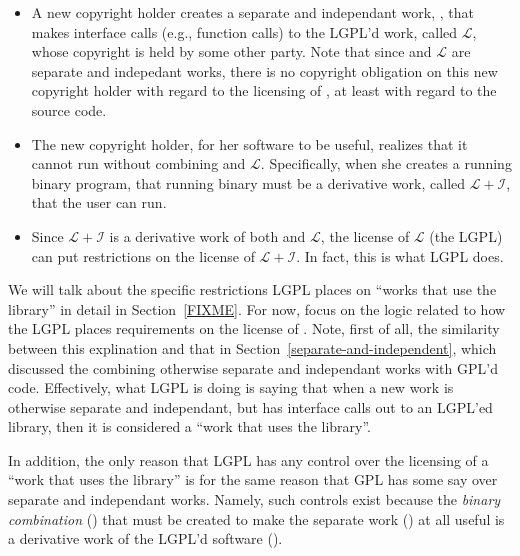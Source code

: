 \documentclass[12pt]{report}
\begin{document}
\begin{itemize}

\newcommand{\workl}{$\mathcal{L}$}
\newcommand{\lplusi}{$\mathcal{L\!\!+\!\!I}$}

\item A new copyright holder creates a separate and independant work,
  \worki{}, that makes interface calls (e.g., function calls) to the
  LGPL'd work, called \workl{}, whose copyright is held by some other
  party.  Note that since \worki{} and \workl{} are separate and
  indepedant works, there is no copyright obligation on this new copyright
  holder with regard to the licensing of \worki{}, at least with regard to
  the source code.

\item The new copyright holder, for her software to be useful, realizes
  that it cannot run without combining \worki{} and \workl{}.
  Specifically, when she creates a running binary program, that running
  binary must be a derivative work, called \lplusi{}, that the user can
  run.

\item Since \lplusi{} is a derivative work of both \worki{} and \workl{},
  the license of \workl{} (the LGPL) can put restrictions on the license
  of \lplusi{}.  In fact, this is what LGPL does.

\end{itemize}

We will talk about the specific restrictions LGPL places on ``works that
use the library'' in detail in Section~\ref{FIXME}.  For now, focus on the
logic related to how the LGPL places requirements on the license of
\lplusi{}.  Note, first of all, the similarity between this explination
and that in Section~\ref{separate-and-independent}, which discussed the
combining otherwise separate and independant works with GPL'd code.
Effectively, what LGPL is doing is saying that when a new work is
otherwise separate and independant, but has interface calls out to an
LGPL'ed library, then it is considered a ``work that uses the library''.

In addition, the only reason that LGPL has any control over the licensing
of a ``work that uses the library'' is for the same reason that GPL has
some say over separate and independant works.  Namely, such controls exist
because the {\em binary combination\/} (\lplusi{}) that must be created to
make the separate work (\worki{}) at all useful is a derivative work of
the LGPL'd software (\workl{}).
\end{document}
